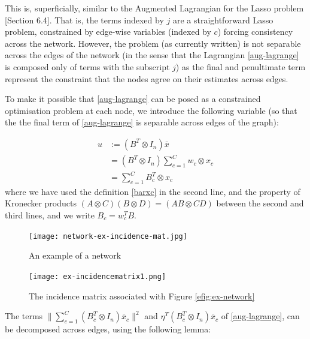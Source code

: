 This is, superficially, similar to the Augmented Lagrangian for the Lasso problem \cite{Boyd2010a}[Section 6.4]. That is, the terms indexed by \(j\) are a straightforward Lasso problem, constrained by edge-wise variables (indexed by \(c\)) forcing consistency across the network. However, the problem (as currently written) is not separable across the edges of the network (in the sense that the Lagrangian \eqref{aug-lagrange} is composed only of terms with the subscript \(j\)) as the final and penultimate term represent the constraint that the nodes agree on their estimates across edges. 

To make it possible that \ref{aug-lagrange} can be posed  as a constrained optimisation problem at each node, we introduce the following variable (so that the the final term of \ref{aug-lagrange} is separable across edges of the graph):

\begin{definition}
\begin{align*}
u &:= \left(B^T \otimes I_n\right)\bar{x} \\
& = \left(B^T \otimes I_n\right)\sum_{c=1}^C w_c \otimes x_c \\
& = \sum	_{c=1}^C B_c^T\otimes x_c
\end{align*}
where we have used the definition \eqref{barxc} in the second line, and the property of Kronecker products \((A\otimes C)(B \otimes D) = (AB \otimes CD)\) between the second and third lines, and we write \(B_c = w_c^TB\).
\end{definition}

\begin{figure}[h]
\centering
\texttt{[image: network-ex-incidence-mat.jpg]}
\caption{An example of a network}
\label{efig:ex-network}
\end{figure}

\begin{figure}[h]
\centering
\texttt{[image: ex-incidencematrix1.png]}
\caption{The incidence matrix associated with Figure \eqref{efig:ex-network}}
\label{fig:incidence-matrix}
\end{figure}

The terms \(\|\sum_{c=1}^C\left(B_c^T \otimes I_n\right)\bar{x}_c\|^2\) and \( \eta^T\left(B_c^T \otimes I_n\right)\bar{x}_c \) of \eqref{aug-lagrange}, can be decomposed across edges, using the following lemma:

